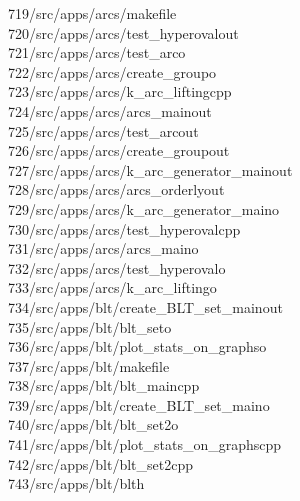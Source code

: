 \begin{tabbing}
719\>/src/apps/arcs/makefile\\[0pt]
720\>/src/apps/arcs/test\_hyperovalout\\[0pt]
721\>/src/apps/arcs/test\_arco\\[0pt]
722\>/src/apps/arcs/create\_groupo\\[0pt]
723\>/src/apps/arcs/k\_arc\_liftingcpp\\[0pt]
724\>/src/apps/arcs/arcs\_mainout\\[0pt]
725\>/src/apps/arcs/test\_arcout\\[0pt]
726\>/src/apps/arcs/create\_groupout\\[0pt]
727\>/src/apps/arcs/k\_arc\_generator\_mainout\\[0pt]
728\>/src/apps/arcs/arcs\_orderlyout\\[0pt]
729\>/src/apps/arcs/k\_arc\_generator\_maino\\[0pt]
730\>/src/apps/arcs/test\_hyperovalcpp\\[0pt]
731\>/src/apps/arcs/arcs\_maino\\[0pt]
732\>/src/apps/arcs/test\_hyperovalo\\[0pt]
733\>/src/apps/arcs/k\_arc\_liftingo\\[0pt]
734\>/src/apps/blt/create\_BLT\_set\_mainout\\[0pt]
735\>/src/apps/blt/blt\_seto\\[0pt]
736\>/src/apps/blt/plot\_stats\_on\_graphso\\[0pt]
737\>/src/apps/blt/makefile\\[0pt]
738\>/src/apps/blt/blt\_maincpp\\[0pt]
739\>/src/apps/blt/create\_BLT\_set\_maino\\[0pt]
740\>/src/apps/blt/blt\_set2o\\[0pt]
741\>/src/apps/blt/plot\_stats\_on\_graphscpp\\[0pt]
742\>/src/apps/blt/blt\_set2cpp\\[0pt]
743\>/src/apps/blt/blth\\[0pt]

\end{tabbing}
